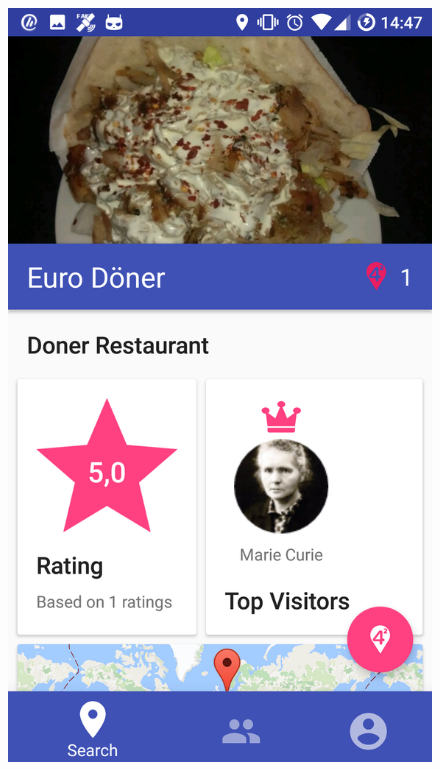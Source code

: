 \documentclass[11pt, accentcolor=tud1c]{tudreport}
\begin{document}
\begin{figure}[h]
\begin{minipage}{.3\textwidth}
  \includegraphics[width=.8\linewidth]{./res/venue.png}
  \label{fig:live_chat}
\end{minipage}%
\end{figure}
\end{document}

